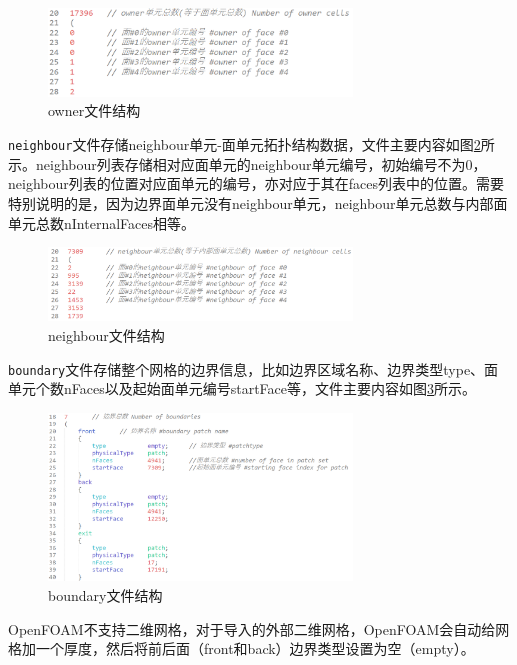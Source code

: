 \begin{figure}[htp]
	\centering
	\includegraphics[width=0.72\textwidth]{./figures/owner.png}
	\caption{owner文件结构}
	\label{fig:owner_file}	
\end{figure}

\texttt{neighbour}文件存储neighbour单元-面单元拓扑结构数据，文件主要内容如图\ref{fig:neighbour_file}所示。neighbour列表存储相对应面单元的neighbour单元编号，初始编号不为0，neighbour列表的位置对应面单元的编号，亦对应于其在faces列表中的位置。需要特别说明的是，因为边界面单元没有neighbour单元，neighbour单元总数与内部面单元总数nInternalFaces相等。

\begin{figure}[htp]
	\centering
	\includegraphics[width=0.72\textwidth]{./figures/neighbour.png}
	\caption{neighbour文件结构}
	\label{fig:neighbour_file}	
\end{figure}

\texttt{boundary}文件存储整个网格的边界信息，比如边界区域名称、边界类型type、面单元个数nFaces以及起始面单元编号startFace等，文件主要内容如图\ref{fig:boundary_file}所示。

\begin{figure}[htp]
	\centering
	\includegraphics[width=0.72\textwidth]{./figures/boundary.png}
	\caption{boundary文件结构}
	\label{fig:boundary_file}	
\end{figure}

\noindent OpenFOAM不支持二维网格，对于导入的外部二维网格，OpenFOAM会自动给网格加一个厚度，然后将前后面（front和back）边界类型设置为空（empty）。


